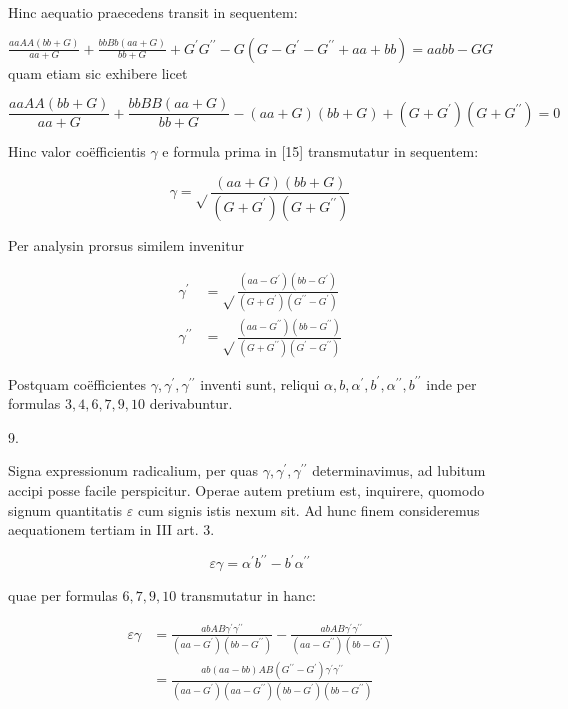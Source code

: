 \documentclass[10pt]{article}
\begin{document}
Hinc aequatio praecedens transit in sequentem:

\(\frac{a a A A(b b+G)}{a a+G}+\frac{b b B b(a a+G)}{b b+G}+G^{\prime} G^{\prime \prime}-G\left(G-G^{\prime}-G^{\prime \prime}+a a+b b\right)=a a b b-G G\) quam etiam sic exhibere licet

\[
\frac{a a A A(b b+G)}{a a+G}+\frac{b b B B(a a+G)}{b b+G}-(a a+G)(b b+G)+\left(G+G^{\prime}\right)\left(G+G^{\prime \prime}\right)=0
\]

Hinc valor coëfficientis \(\gamma\) e formula prima in [15] transmutatur in sequentem:

\[
\gamma=\sqrt{ } \frac{(a a+G)(b b+G)}{\left(G+G^{\prime}\right)\left(G+G^{\prime \prime}\right)}
\]

Per analysin prorsus similem invenitur

\[
\begin{aligned}
\gamma^{\prime} & =\sqrt{ } \frac{\left(a a-G^{\prime}\right)\left(b b-G^{\prime}\right)}{\left(G+G^{\prime}\right)\left(G^{\prime \prime}-G^{\prime}\right)} \\
\gamma^{\prime \prime} & =\sqrt{ } \frac{\left(a a-G^{\prime \prime}\right)\left(b b-G^{\prime \prime}\right)}{\left(G+G^{\prime \prime}\right)\left(G^{\prime}-G^{\prime \prime}\right)}
\end{aligned}
\]

Postquam coëfficientes \(\gamma, \gamma^{\prime}, \gamma^{\prime \prime}\) inventi sunt, reliqui \(\alpha, b, \alpha^{\prime}, b^{\prime}, \alpha^{\prime \prime}, b^{\prime \prime}\) inde per formulas \(3,4,6,7,9,10\) derivabuntur.

9.

Signa expressionum radicalium, per quas \(\gamma, \gamma^{\prime}, \gamma^{\prime \prime}\) determinavimus, ad lubitum accipi posse facile perspicitur. Operae autem pretium est, inquirere, quomodo signum quantitatis \(\varepsilon\) cum signis istis nexum sit. Ad hunc finem consideremus aequationem tertiam in III art. 3.

\[
\varepsilon \gamma=\alpha^{\prime} b^{\prime \prime}-b^{\prime} \alpha^{\prime \prime}
\]

quae per formulas \(6,7,9,10\) transmutatur in hanc:

\[
\begin{aligned}
\varepsilon \gamma & =\frac{a b A B \gamma^{\prime} \gamma^{\prime \prime}}{\left(a a-G^{\prime}\right)\left(b b-G^{\prime \prime}\right)}-\frac{a b A B \gamma^{\prime} \gamma^{\prime \prime}}{\left(a a-G^{\prime \prime}\right)\left(b b-G^{\prime}\right)} \\
& =\frac{a b(a a-b b) A B\left(G^{\prime \prime}-G^{\prime}\right) \gamma^{\prime} \gamma^{\prime \prime}}{\left(a a-G^{\prime}\right)\left(a a-G^{\prime \prime}\right)\left(b b-G^{\prime}\right)\left(b b-G^{\prime \prime}\right)}
\end{aligned}
\]
\end{document}
